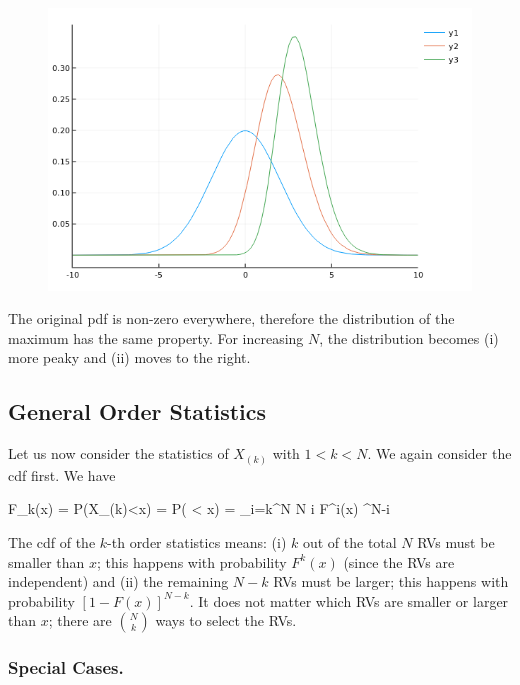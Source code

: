 \begin{figure}[H]
	\centering
	\includegraphics[scale=0.7]{images/order_stat_1_1.png}
\end{figure}

The original pdf is non-zero everywhere, therefore the distribution of the maximum has the same property. For increasing $N$, the distribution becomes (i) more peaky and (ii) moves to the right.



\subsection{General Order Statistics}

Let us now consider the statistics of $X_{(k)}$ with $1 < k < N$. We again consider the cdf first. We have

\bee
F_k(x) = P(X_{(k)}<x) = P( < x) = \sum_{i=k}^N {N \choose i} F^i(x) \left[ 1 - F(x) \right]^{N-i}
\eee

The cdf of the $k$-th order statistics means: (i) $k$ out of the total $N$ RVs must be smaller than $x$; this happens with probability $F^k(x)$ (since the RVs are independent) and (ii) the remaining $N-k$ RVs must be larger; this happens with probability $\left[ 1 - F(x) \right]^{N-k}$. It does not matter which RVs are smaller or larger than $x$; there are ${N \choose k}$ ways to select the RVs.

\subsubsection{Special Cases.}

